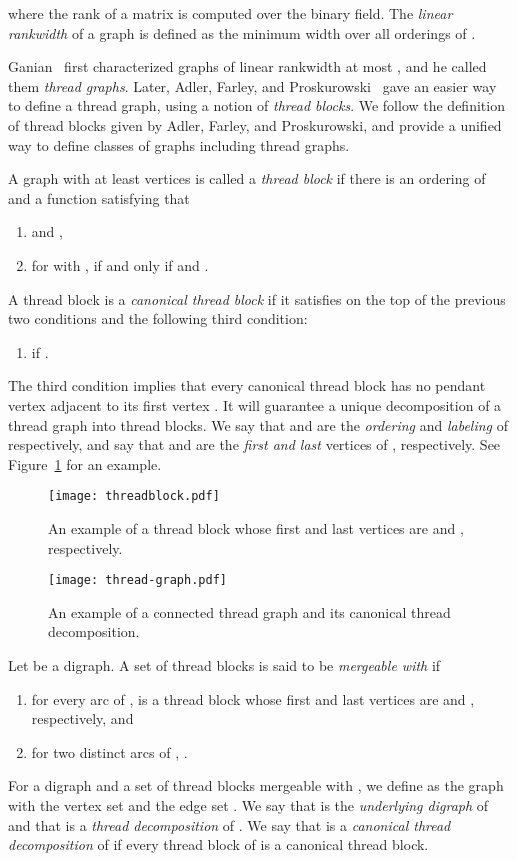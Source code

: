 \documentclass[11pt]{article}
\theoremstyle{remark}
\begin{document}
where the rank of a matrix is computed over the binary field. The \emph{linear rankwidth} of a graph  is defined as the minimum width over all orderings of .

Ganian~\cite{Ganian10} first characterized graphs of linear rankwidth at most , and he called them \emph{thread graphs}. 
Later, Adler, Farley, and Proskurowski~\cite{AFP2013} gave an easier way to define a thread graph, using a notion of \emph{thread blocks}.
We follow the definition of thread blocks given by Adler, Farley, and Proskurowski, and provide a unified way to define classes of graphs including thread graphs.


A graph  with at least  vertices is called a \emph{thread block}
if there is an ordering  of  and a function  satisfying that
\begin{enumerate}[(1)]
\item  and ,
\item for  with ,  if and only if  and .
\end{enumerate}
A thread block is a \emph{canonical thread block} if it satisfies on the top of the previous two conditions and the following third condition:
\begin{enumerate}[(3)]
\item  if .
\end{enumerate}
The third condition implies that every canonical thread block has no pendant vertex adjacent to its first vertex .
It will guarantee a unique decomposition of a thread graph into thread blocks. 
We say that  and  are the \emph{ordering} and \emph{labeling} of  respectively, and 
say that  and  are the \emph{first and last} vertices of , respectively.
See Figure~\ref{fig:threadblock} for an example.


\begin{figure}
\centerline{\texttt{[image: threadblock.pdf]}}
\caption{An example of a thread block whose first and last vertices are  and , respectively.} \label{fig:threadblock}
\end{figure}
\begin{figure}
\centerline{\texttt{[image: thread-graph.pdf]}}
\caption{An example of a connected thread graph and its canonical thread decomposition.} \label{fig:threadgraph}
\end{figure}

Let  be a digraph.
A  set  of thread blocks is said to be 
\emph{mergeable with } if
\begin{enumerate}[(1)]
\item for every arc  of ,  is a thread block whose first and last vertices are  and , respectively, and
\item  for two distinct arcs  of , .
\end{enumerate}
For a digraph  and a set of thread blocks  mergeable with , we define  as the graph  with the vertex set   and the edge set .
We say that  is the \emph{underlying digraph} of  and that  is a \emph{thread decomposition} of .
We say that   is a \emph{canonical thread decomposition} of 
if every thread block of  is a canonical thread block.
\end{document}
